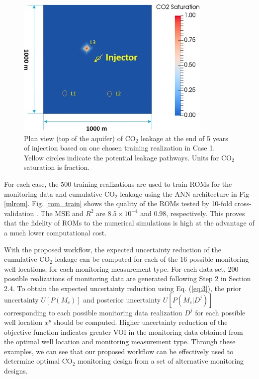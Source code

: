 \documentclass[10pt, twoside]{article}
\begin{document}
\begin{figure} [H]
\centering
\includegraphics[width=8.5 cm]{Figure 9.jpg}
\caption{Plan view (top of the aquifer) of CO$_2$ leakage at the end of 5 years of injection based on one chosen training realization in Case 1. Yellow circles indicate the potential leakage pathways. Units for CO$_2$ saturation is fraction.}
\label{cum_leak_map}
\end{figure}

For each case, the 500 training realizations are used to train ROMs for the monitoring data and cumulative CO$_2$ leakage using the ANN architecture in Fig \ref{mlrom}. Fig. \ref{rom_train} shows the quality of the ROMs tested by 10-fold cross-validation \citep{Geisser1993, Xu2018249}. The MSE and $R^2$ are $8.5\times10^{-4}$ and $0.98$, respectively. This proves that the fidelity of ROMs to the numerical simulations is high at the advantage of a much lower computational cost.

With the proposed workflow, the expected uncertainty reduction of the cumulative CO$_2$ leakage can be computed for each of the 16 possible monitoring well locations, for each monitoring measurement type. For each data set, 200 possible realizations of monitoring data are generated following Step 2 in Section 2.4. To obtain the expected uncertainty reduction using Eq. (\ref{eq:3}), the prior uncertainty $U[P(M_c)]$ and posterior uncertainty $U[P(M_c \vert D^j)]$ corresponding to each possible monitoring data realization $D^j$ for each possible well location $x^p$ should be computed. Higher uncertainty reduction of the objective function indicates greater VOI in the monitoring data obtained from the optimal well location and monitoring measurement type. Through these examples, we can see that our proposed workflow can be effectively used to determine optimal CO$_2$ monitoring design from a set of alternative monitoring designs.
\end{document}
